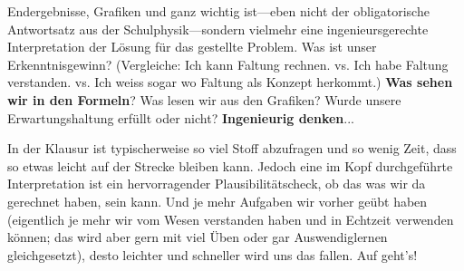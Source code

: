 \begin{Loesung}
Endergebnisse, Grafiken und ganz wichtig ist---eben nicht der obligatorische Antwortsatz
aus der Schulphysik---sondern vielmehr eine ingenieursgerechte Interpretation der Lösung
für das gestellte Problem.
%
Was ist unser Erkenntnisgewinn?
%
(Vergleiche: Ich kann Faltung rechnen. vs. Ich habe Faltung verstanden. vs. Ich weiss sogar wo Faltung als Konzept herkommt.)
%
\textbf{Was sehen wir in den Formeln}?
%
Was lesen wir aus den Grafiken?
%
Wurde unsere Erwartungshaltung erfüllt oder nicht? \textbf{Ingenieurig denken}...

In der Klausur ist typischerweise so viel Stoff abzufragen und so wenig Zeit,
dass so etwas leicht auf der Strecke bleiben kann. Jedoch eine im Kopf
durchgeführte Interpretation ist ein hervorragender Plausibilitätscheck, ob das was
wir da gerechnet haben, sein kann. Und je mehr Aufgaben wir
vorher geübt haben (eigentlich je mehr wir vom Wesen verstanden haben und in
Echtzeit verwenden können; das wird aber gern mit viel Üben oder gar
Auswendiglernen gleichgesetzt),
desto leichter und schneller wird uns das fallen.
%
Auf geht's!
\end{Loesung}


